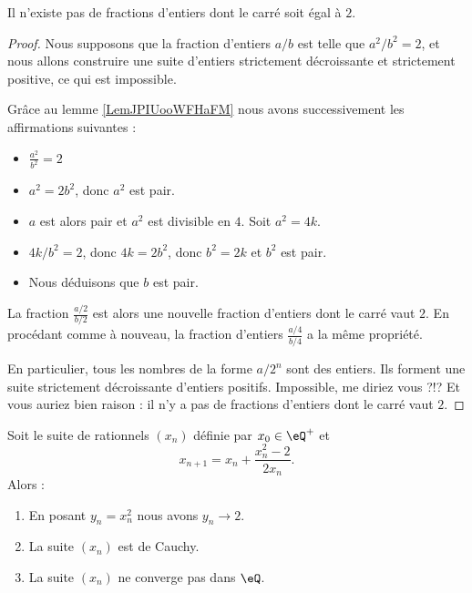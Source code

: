 \begin{proposition}
    Il n'existe pas de fractions d'entiers dont le carré soit égal à \( 2\).
\end{proposition}

\begin{proof}
    Nous supposons que la fraction d'entiers \( a/b\) est telle que \( a^2/b^2=2\), et nous allons construire une suite d'entiers strictement décroissante et strictement positive, ce qui est impossible.

    Grâce au lemme \ref{LemJPIUooWFHaFM} nous avons successivement les affirmations suivantes :
    \begin{itemize}
        \item 
        $\frac{ a^2 }{ b^2 }=2$
    \item
        \( a^2=2b^2\), donc \( a^2\) est pair.
    \item
        \( a\) est alors pair et \( a^2\) est divisible en \( 4\). Soit \( a^2=4k\).
    \item
        \( 4k/b^2=2\), donc \( 4k=2b^2\), donc \( b^2=2k\) et \( b^2\) est pair.
    \item
        Nous déduisons que \( b\) est pair.
    \end{itemize}
    La fraction \( \frac{ a/2 }{ b/2 }\) est alors une nouvelle fraction d'entiers dont le carré vaut $2$. En procédant comme à nouveau, la fraction d'entiers \( \frac{ a/4 }{ b/4 }\) a la même propriété.

    En particulier, tous les nombres de la forme \( a/2^n\) sont des entiers.  Ils forment une suite strictement décroissante d'entiers positifs.  Impossible, me diriez vous ?!? Et vous auriez bien raison : il n'y a pas de fractions d'entiers dont le carré vaut \( 2\).
\end{proof}

\begin{proposition}
    Soit le suite de rationnels \( (x_n)\) définie par \( x_0\in \eQ^+\) et 
    \begin{equation}
        x_{n+1}=x_n+\frac{ x_n^2-2 }{ 2x_n }.
    \end{equation}
    Alors :
    \begin{enumerate}
        \item
            En posant \( y_n=x_n^2\) nous avons \( y_n\to 2\).
        \item
            La suite \( (x_n)\) est de Cauchy.
        \item
            La suite \( (x_n)\) ne converge pas dans \( \eQ\).
    \end{enumerate}
\end{proposition}

